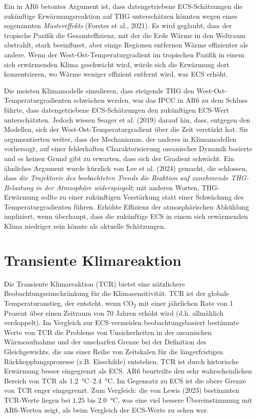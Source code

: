 \documentclass[12pt,paper=a4,DIV=12,parskip=never,chapterprefix=false,headings=standardclasses]{scrreprt}
\begin{document}
Ein in AR6 betontes Argument ist, dass datengetriebene ECS-Schätzungen die zukünftige Erwärmungsreaktion auf THG unterschätzen könnten wegen eines sogenannten \emph{Mustereffekts} (Forster et al., 2021). Es wird geglaubt, dass der tropische Pazifik die Gesamteffizienz, mit der die Erde Wärme in den Weltraum abstrahlt, stark beeinflusst, aber einige Regionen entfernen Wärme effizienter als andere. Wenn der West-Ost-Temperaturgradient im tropischen Pazifik in einem sich erwärmenden Klima geschwächt wird, würde sich die Erwärmung dort konzentrieren, wo Wärme weniger effizient entfernt wird, was ECS erhöht.

Die meisten Klimamodelle simulieren, dass steigende THG den West-Ost-Temperatur\-gradienten schwächen werden, was das IPCC in AR6 zu dem Schluss führte, dass datengetriebene ECS-Schätzungen den zukünftigen ECS-Wert unterschätzten. Jedoch wiesen Seager et al. (2019) darauf hin, dass, entgegen den Modellen, sich der West-Ost-Temperaturgradient über die Zeit verstärkt hat. Sie argumentierten weiter, dass der Mechanismus, der anderes in Klimamodellen vorhersagt, auf einer fehlerhaften Charakterisierung ozeanischer Dynamik basierte und es keinen Grund gibt zu erwarten, dass sich der Gradient schwächt. Ein ähnliches Argument wurde kürzlich von Lee et al. (2024) gemacht, die schlossen, dass \emph{die Trajektorie des beobachteten Trends die Reaktion auf zunehmende THG-Belastung in der Atmosphäre widerspiegelt}; mit anderen Worten, THG-Erwärmung sollte zu einer zukünftigen Verstärkung statt einer Schwächung des Temperaturgradienten führen. Erhöhte Effizienz der atmosphärischen Abkühlung impliziert, wenn überhaupt, dass die zukünftige ECS in einem sich erwärmenden Klima niedriger sein könnte als aktuelle Schätzungen.

\section{Transiente Klimareaktion}
Die Transiente Klimareaktion (TCR) bietet eine nützlichere Beobachtungseinschränkung für die Klimasensitivität. TCR ist der globale Temperaturanstieg, der entsteht, wenn CO$_2$ mit einer jährlichen Rate von 1 Prozent über einen Zeitraum von 70 Jahren erhöht wird (d.h. allmählich verdoppelt). Im Vergleich zur ECS vermeiden beobachtungsbasiert bestimmte Werte von TCR die Probleme von Unsicherheiten in der ozeanischen Wärmeaufnahme und der unscharfen Grenze bei der Definition des Gleichgewichts, die aus einer Reihe von Zeitskalen für die längerfristigen Rückkopplungsprozesse (z.B. Eisschilde) entstehen. TCR ist durch historische Erwärmung besser eingegrenzt als ECS. AR6 beurteilte den sehr wahrscheinlichen Bereich von TCR als \SIrange{1.2}{2.4}{\celsius}. Im Gegensatz zu ECS ist die obere Grenze von TCR enger eingegrenzt. Zum Vergleich: die von Lewis (2023) bestimmten TCR-Werte liegen bei $1.25$ bis \SI{2.0}{\celsius}, was eine viel bessere Übereinstimmung mit AR6-Werten zeigt, als beim Vergleich der ECS-Werte zu sehen war.
\end{document}
